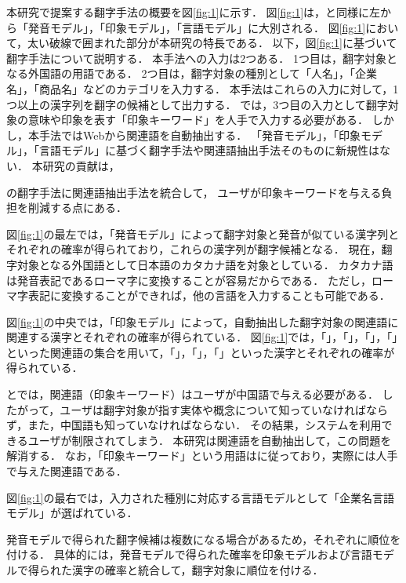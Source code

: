 \documentclass[japanese]{jnlp_1.4}
\begin{document}
本研究で提案する翻字手法の概要を図\ref{fig:1}に示す． 
図\ref{fig:1}は，\cite{Article_21}と同様に左から「発音モデル」，「印象モデル」，「言語モデル」に大別される．
図\ref{fig:1}において，太い破線で囲まれた部分が本研究の特長である．
以下，\mbox{図\ref{fig:1}}に基づいて翻字手法について説明する．
本手法への入力は2つある．
1つ目は，翻字対象となる外国語の用語である．
2つ目は，翻字対象の種別として「人名」，「企業名」，「商品名」などのカテゴリを入力する．
本手法はこれらの入力に対して，1つ以上の漢字列を翻字の候補として出力する．
\cite{Article_21}では，3つ目の入力として翻字対象の意味や印象を表す「印象キーワード」を人手で入力する必要がある．
しかし，本手法ではWebから関連語を自動抽出する．
「発音モデル」，「印象モデル」，「言語モデル」に基づく翻字手法や関連語抽出手法そのものに新規性はない．
本研究の貢献は，{\cite{Article_21}の翻字手法に関連語抽出手法を統合して，
ユーザが印象キーワードを与える負担を削減する点にある．

図\ref{fig:1}の最左では，「発音モデル」によって翻字対象と発音が似ている漢字列とそれぞれの確率が得られており，これらの漢字列が翻字候補となる．
現在，翻字対象となる外国語として日本語のカタカナ語を対象としている．
カタカナ語は発音表記であるローマ字に変換することが容易だからである．
ただし，ローマ字表記に変換することができれば，他の言語を入力することも可能である．

図\ref{fig:1}の中央では，「印象モデル」によって，自動抽出した翻字対象の関連語に関連する漢字とそれぞれの確率が得られている．
図\ref{fig:1}では，「」，「」，「」，「」といった関連語の集合を用いて，「」，「」，「」といった漢字とそれぞれの確率が得られている．

\cite{Article_19}と\cite{Article_21}では，関連語（印象キーワード）はユーザが中国語で与える必要がある．
したがって，ユーザは翻字対象が指す実体や概念について知っていなければならず，また，中国語も知っていなければならない．
その結果，システムを利用できるユーザが制限されてしまう．
本研究は関連語を自動抽出して，この問題を解消する．
なお，「印象キーワード」という用語は\cite{Article_21}に従っており，実際には人手で与えた関連語である．

図\ref{fig:1}の最右では，入力された種別に対応する言語モデルとして「企業名言語モデル」が選ばれている．

発音モデルで得られた翻字候補は複数になる場合があるため，それぞれに順位を付ける．
具体的には，発音モデルで得られた確率を印象モデルおよび言語モデルで得られた漢字の確率と統合して，翻字対象に順位を付ける．

}
\end{document}
